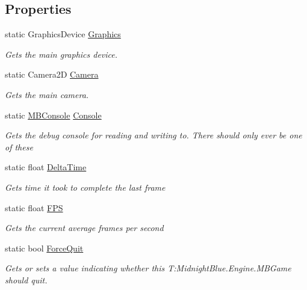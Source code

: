 \subsection*{Properties}
\begin{DoxyCompactItemize}
\item 
static Graphics\+Device \hyperlink{class_midnight_blue_1_1_engine_1_1_m_b_game_a634a292296cdc4df062c0769d76e21b1}{Graphics}
\begin{DoxyCompactList}\small\item\em Gets the main graphics device. \end{DoxyCompactList}\item 
static Camera2D \hyperlink{class_midnight_blue_1_1_engine_1_1_m_b_game_a5fffc745c017e76c148816493f7d0cbb}{Camera}
\begin{DoxyCompactList}\small\item\em Gets the main camera. \end{DoxyCompactList}\item 
static \hyperlink{class_midnight_blue_1_1_engine_1_1_m_b_console}{M\+B\+Console} \hyperlink{class_midnight_blue_1_1_engine_1_1_m_b_game_ad258df9f554e120fee5db56513248845}{Console}
\begin{DoxyCompactList}\small\item\em Gets the debug console for reading and writing to. There should only ever be one of these \end{DoxyCompactList}\item 
static float \hyperlink{class_midnight_blue_1_1_engine_1_1_m_b_game_a8d74b0cdb60f27e8a1934854f540a7bc}{Delta\+Time}
\begin{DoxyCompactList}\small\item\em Gets time it took to complete the last frame \end{DoxyCompactList}\item 
static float \hyperlink{class_midnight_blue_1_1_engine_1_1_m_b_game_a6385d036d9230a1e08f669b340951e55}{F\+PS}
\begin{DoxyCompactList}\small\item\em Gets the current average frames per second \end{DoxyCompactList}\item 
static bool \hyperlink{class_midnight_blue_1_1_engine_1_1_m_b_game_a444312fc226de72869013fa8d055add1}{Force\+Quit}
\begin{DoxyCompactList}\small\item\em Gets or sets a value indicating whether this T\+:\+Midnight\+Blue.\+Engine.\+M\+B\+Game should quit. \end{DoxyCompactList}\end{DoxyCompactItemize}



